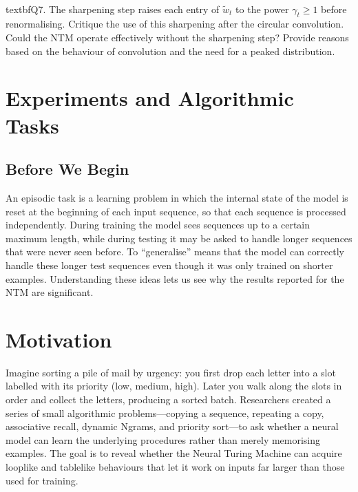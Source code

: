 \documentclass[12pt, a4paper]{article}
\begin{document}
{%
\\textbf{Q7.} The sharpening step raises each entry of $\tilde{w}_t$ to the power $\gamma_t\ge 1$ before renormalising. Critique the use of this sharpening after the circular convolution. Could the NTM operate effectively without the sharpening step? Provide reasons based on the behaviour of convolution and the need for a peaked distribution.

\newpage

\section{Experiments and Algorithmic Tasks}

\subsection{Before We Begin}
An episodic task is a learning problem in which the internal state of the model is reset at the beginning of each input sequence, so that each sequence is processed independently.  During training the model sees sequences up to a certain maximum length, while during testing it may be asked to handle longer sequences that were never seen before.  To ``generalise'' means that the model can correctly handle these longer test sequences even though it was only trained on shorter examples.  Understanding these ideas lets us see why the results reported for the NTM are significant.

\section{Motivation}
Imagine sorting a pile of mail by urgency: you first drop each letter into a slot labelled with its priority (low, medium, high). Later you walk along the slots in order and collect the letters, producing a sorted batch.  Researchers created a series of small algorithmic problems---copying a sequence, repeating a copy, associative recall, dynamic Ngrams, and priority sort---to ask whether a neural model can learn the underlying procedures rather than merely memorising examples.  The goal is to reveal whether the Neural Turing Machine can acquire looplike and tablelike behaviours that let it work on inputs far larger than those used for training.

}
\end{document}
